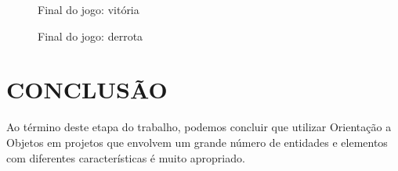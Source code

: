 \documentclass[rel_mlp]{iiufrgs}
\begin{document}
\begin{figure}[htb]
    \centering
    \caption{Final do jogo: vitória}
    \label{fig:figura1}
\end{figure}

\begin{figure}[htb]
    \centering
    \caption{Final do jogo: derrota}
    \label{fig:figura1}
\end{figure}

%
\chapter{CONCLUSÃO}

Ao término deste etapa do trabalho, podemos concluir que utilizar Orientação a Objetos em projetos que envolvem um grande número de entidades e elementos com diferentes características é muito apropriado.
\end{document}
